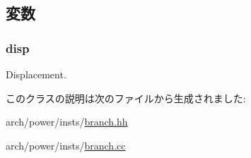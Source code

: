 \subsection{変数}
\hypertarget{classPowerISA_1_1BranchPCRelCond_a0c5598bcc641a0989f32ce0b0ea29bb3}{
\subsubsection[{disp}]{ {\bf disp}}}
\label{classPowerISA_1_1BranchPCRelCond_a0c5598bcc641a0989f32ce0b0ea29bb3}


Displacement. 

このクラスの説明は次のファイルから生成されました:\begin{DoxyCompactItemize}
\item 
arch/power/insts/\hyperlink{power_2insts_2branch_8hh}{branch.hh}\item 
arch/power/insts/\hyperlink{branch_8cc}{branch.cc}\end{DoxyCompactItemize}
